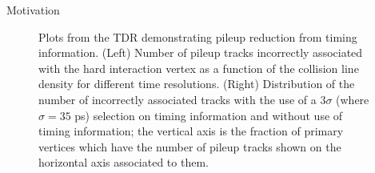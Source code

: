 \begin{section}{Motivation}
\begin{figure}[htb]
\begin{center}
\quad
{}
\end{center}
\caption{Plots from the TDR\cite{cite-mtd-tdr} demonstrating pileup reduction from timing information. (Left) Number of pileup tracks incorrectly associated with the hard interaction vertex as a function of the collision line density for different time resolutions. (Right) Distribution of the number of incorrectly associated tracks with the use of a $3\sigma$ (where $\sigma = 35$ ps) selection on timing information and without use of timing information; the vertical axis is the fraction of primary vertices which have the number of pileup tracks shown on the horizontal axis
associated to them.}
\label{fig:pileup-reduce}
\end{figure}

\end{section}

